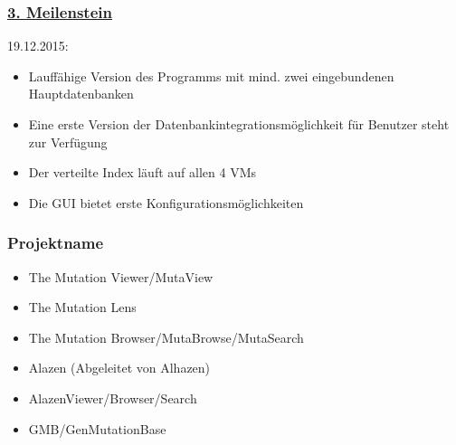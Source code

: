 \documentclass{beamer}
\begin{document}
\begin{frame}
 \frametitle{\underline{3. Meilenstein}}
 19.12.2015:
 \begin{itemize}
 \item Lauffähige Version des Programms mit mind. zwei eingebundenen Hauptdatenbanken
 \item Eine erste Version der Datenbankintegrationsmöglichkeit für Benutzer steht zur Verfügung
 \item Der verteilte Index läuft auf allen 4 VMs
 \item Die GUI bietet erste Konfigurationsmöglichkeiten 
 \end{itemize}
\end{frame}

\begin{frame}
 \frametitle{Projektname}
 \begin{itemize}[<+->]
 \item The Mutation Viewer/MutaView
 \item The Mutation Lens
 \item The Mutation Browser/MutaBrowse/MutaSearch
 \item Alazen (Abgeleitet von Alhazen)
 \item AlazenViewer/Browser/Search
 \item GMB/GenMutationBase
 \end{itemize}
\end{frame}
\end{document}
